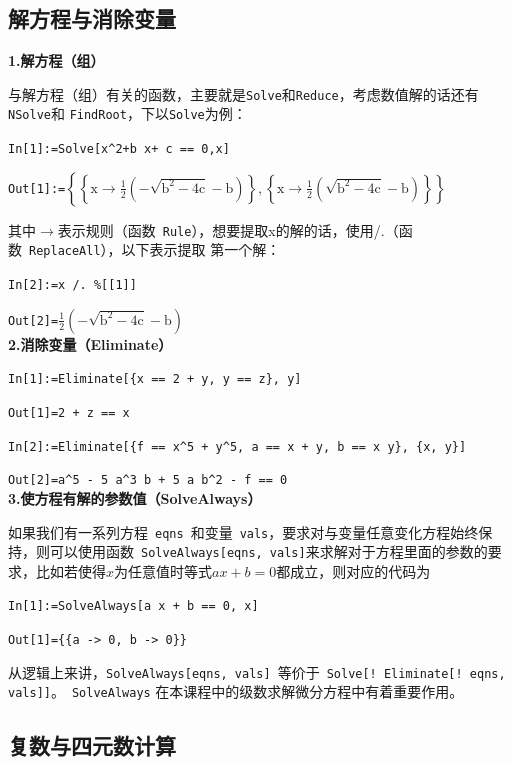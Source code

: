 \documentclass[UTF8,a4paper,10pt]{ctexart}
\begin{document}
\subsection{解方程与消除变量}

\textbf{1.解方程（组）}

与解方程（组）有关的函数，主要就是\verb|Solve|和\verb|Reduce|，考虑数值解的话还有\verb|NSolve|和
\verb|FindRoot|，下以\verb|Solve|为例：

\verb|In[1]:=Solve[x^2+b x+ c == 0,x]|

\verb|Out[1]:=|$\left\{\left\{\text{x}\to \frac{1}{2} \left(-\sqrt{\text{b}^2-4 \text{c}}-\text{b}\right)\right\},\left\{\text{x}\to \frac{1}{2} \left(\sqrt{\text{b}^2-4 \text{c}}-\text{b}\right)\right\}\right\}$

其中$\to$表示规则（函数~\verb|Rule|），想要提取x的解的话，使用/.（函数~\verb|ReplaceAll|），以下表示提取
第一个解：

\verb|In[2]:=x /. %[[1]]|

\verb|Out[2]=|$\frac{1}{2} \left(-\sqrt{\text{b}^2-4 \text{c}}-\text{b}\right)$
\\

\textbf{2.消除变量（Eliminate）}

\verb|In[1]:=Eliminate[{x == 2 + y, y == z}, y]|

\verb|Out[1]=2 + z == x|   

\verb|In[2]:=Eliminate[{f == x^5 + y^5, a == x + y, b == x y}, {x, y}]|   

\verb|Out[2]=a^5 - 5 a^3 b + 5 a b^2 - f == 0|   
\\

\textbf{3.使方程有解的参数值（SolveAlways）}

如果我们有一系列方程~\verb|eqns|~和变量~\verb|vals|，要求对与变量任意变化方程始终保持，则可以使用函数~\verb|SolveAlways[eqns, vals]|来求解对于方程里面的参数的要求，比如若使得$x$为任意值时等式$a x + b = 0$都成立，则对应的代码为

\verb|In[1]:=SolveAlways[a x + b == 0, x]|

\verb|Out[1]={{a -> 0, b -> 0}}|   

从逻辑上来讲，\verb|SolveAlways[eqns, vals]|~等价于~\verb|Solve[! Eliminate[! eqns, vals]]|。~\verb|SolveAlways|
在本课程中的级数求解微分方程中有着重要作用。


\subsection{复数与四元数计算}
\end{document}
